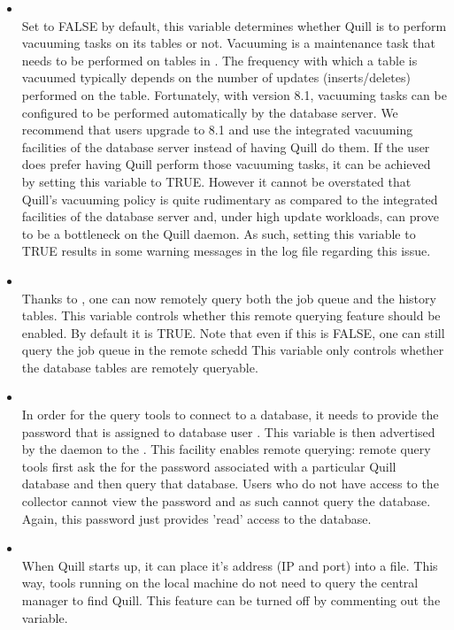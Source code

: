 \begin{itemize}
\item {}\\
Set to FALSE by default, this variable determines whether Quill is to 
perform vacuuming tasks on its tables or not. Vacuuming is a maintenance 
task that needs to be performed on tables in . The 
frequency with which a table is vacuumed typically depends on the number 
of updates (inserts/deletes) performed on the table. Fortunately, with 
 version 8.1, vacuuming tasks can be configured to be 
performed automatically by the database server. We recommend that users 
upgrade to 8.1 and use the integrated vacuuming facilities of the database 
server instead of having Quill do them. If the user does prefer having 
Quill perform those vacuuming tasks, it can be achieved by setting this 
variable to TRUE. However it cannot be overstated that Quill's vacuuming 
policy is quite rudimentary as compared to the integrated facilities 
of the database server and, under high update workloads, can prove to 
be a bottleneck on the Quill daemon. As such, setting this variable to 
TRUE results in some warning messages in the log file regarding this 
issue.

\item {}\\
Thanks to 
,
one can now remotely query both the job queue and the
history tables. This variable controls whether this remote querying 
feature should be enabled.  By default it is TRUE.  Note that even if 
this is FALSE, one can still query the job queue in the remote schedd
This variable only controls whether the database tables are remotely queryable.

\item {}\\
In order for the query tools to connect to a database, it needs to provide
the password that is assigned to database user . 
This variable is then advertised by the  daemon
to the .  
This facility enables remote querying: remote  query tools first 
ask the  for the password associated with a particular Quill database 
and then query that database.  Users who do not have access to the collector 
cannot view the password and as such cannot query the database.  Again, this 
password just provides 'read' access to the database.

\item {}\\
When Quill starts up, it can place it's address (IP and port)
into a file.  This way, tools running on the local machine do not
need to query the central manager to find Quill.  This 
feature can be turned off by commenting out the variable.

\end{itemize}


